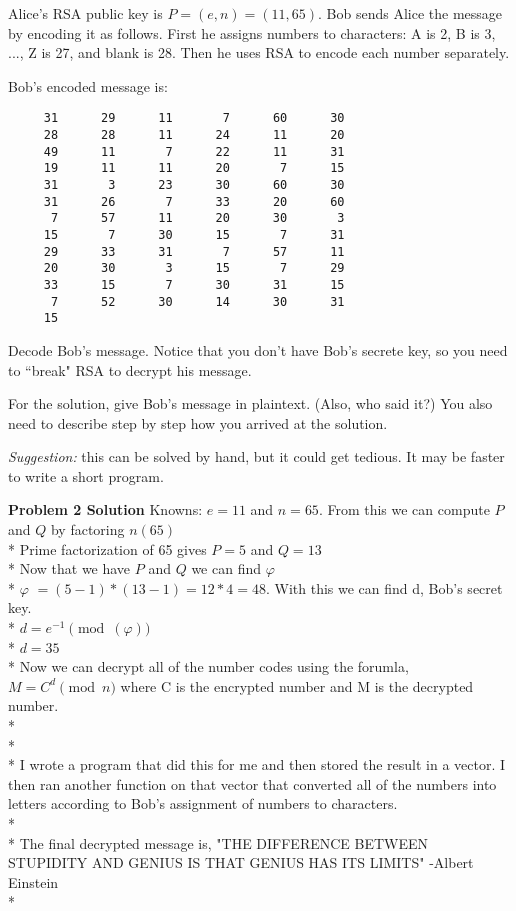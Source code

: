 \documentclass{article}
\begin{document}

\begin{problem}
Alice's RSA public key is $P = (e,n) = (11,65)$.
Bob sends Alice the message by encoding it as follows.
First he assigns numbers to characters:
A is 2, B is 3, ..., Z is 27, and blank is 28. Then he
uses RSA to encode each number separately. 

Bob's encoded message is:

\begin{verbatim}
     31      29      11       7      60      30
     28      28      11      24      11      20
     49      11       7      22      11      31
     19      11      11      20       7      15
     31       3      23      30      60      30
     31      26       7      33      20      60
      7      57      11      20      30       3
     15       7      30      15       7      31
     29      33      31       7      57      11
     20      30       3      15       7      29
     33      15       7      30      31      15
      7      52      30      14      30      31
     15
\end{verbatim}

Decode Bob's message.
Notice that you don't have Bob's secrete key, so you
need to ``break" RSA to decrypt his message.

For the solution, give Bob's message in plaintext. (Also, who said it?)
You also need to describe step by step how you arrived at the solution. 

\emph{Suggestion:} this can be solved by hand, but it could get tedious. It may
be faster to write a short program.
\end{problem}


\textbf{Problem 2 Solution}
Knowns: $e = 11$ and $n = 65$. From this we can compute $P$ and $Q$ by factoring $n(65)$
\\* 
Prime factorization of 65 gives $P = 5$ and $Q = 13$
\\*
Now that we have $P$ and $Q$ we can find $\varphi$ 
\\*
$\varphi$ $= (5-1)*(13-1) = 12*4 = 48$. With this we can find d, Bob's secret key.
\\*
$d = e^{-1} \pmod{(\varphi)}$
\\*
$d = 35$
\\*
Now we can decrypt all of the number codes using the forumla, $M = C^{d}\pmod{n}$ where C is the encrypted number and M is the decrypted number.
\\* \\* \\* 
I wrote a program that did this for me and then stored the result in a vector. I then ran another function on that vector that converted all of the numbers into letters according to Bob's assignment of numbers to characters.
\\* \\* 
The final decrypted message is, "THE DIFFERENCE BETWEEN STUPIDITY AND GENIUS IS THAT GENIUS HAS ITS LIMITS" -Albert Einstein
\\*
\end{document}
